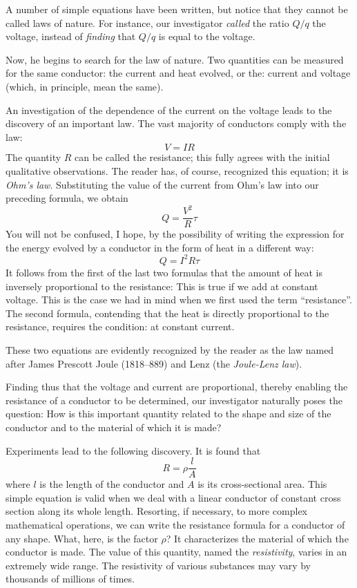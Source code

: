 A number of simple equations have been written, but notice that they cannot be called laws of nature. For instance, our investigator \emph{called} the ratio $Q/q$ the voltage, instead of \emph{finding} that $Q/q$ is equal to the voltage.

Now, he begins to search for the law of nature. Two quantities can be measured for the same conductor: the current and heat evolved, or the: current and voltage (which, in principle, mean the same).

An investigation of the dependence of the current on the voltage leads to the discovery of an important law. The vast majority of conductors comply with the law:
\begin{equation*}%
V=IR
\end{equation*}
The quantity $R$ can be called the resistance; this fully agrees with the initial qualitative observations. The reader has, of course, recognized this equation; it is \emph{Ohm's law}. Substituting the value of the current from Ohm's law into our preceding formula, we obtain
\begin{equation*}%
Q = \frac{V^{2}}{R} \tau
\end{equation*}
You will not be confused, I hope, by the possibility of writing the expression for the energy evolved by a conductor in the form of heat in a different way:
\begin{equation*}%
Q = I^{2}R \tau
\end{equation*}
It follows from the first of the last two formulas that the amount of heat is inversely proportional to the resistance: This is true if we add at constant voltage. This is the case we had in mind when we first used the term ``resistance''. The second formula, contending that the heat is directly proportional to the resistance, requires the condition: at constant current.

These two equations are evidently recognized by the reader as the law named after James Prescott Joule (1818--889) and Lenz (the \emph{Joule-Lenz law}).

Finding thus that the voltage and current are proportional, thereby enabling the resistance of a conductor to be determined, our investigator naturally poses the question: How is this important quantity related to the shape and size of the conductor and to the material of which it is made?

Experiments lead to the following discovery. It is found that
\begin{equation*}%
R = \rho \frac{l}{A}
\end{equation*}
where $l$ is the length of the conductor and $A$ is its cross-sectional area. This simple equation is valid when we deal with a linear conductor of constant cross section along its whole length. Resorting, if necessary, to more complex mathematical operations, we can write the resistance formula for a conductor of any shape. What, here, is the factor $\rho$? It characterizes the material of which the conductor is made. The value of this quantity, named the \emph{resistivity}, varies in an extremely wide range. The resistivity of various substances may vary by thousands of millions of times.

